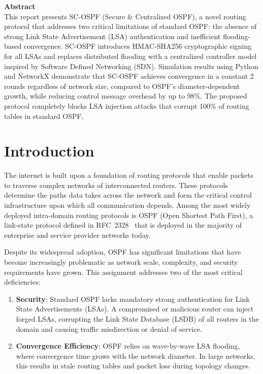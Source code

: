 \documentclass[12pt,a4paper]{article}
\begin{document}
\begin{titlepage}
\begin{mdframed}[backgroundcolor=lightgreen,linecolor=accentteal]
\textbf{\color{accentteal}Abstract}\\[4pt]
This report presents SC-OSPF (Secure \& Centralized OSPF), a novel routing
protocol that addresses two critical limitations of standard OSPF: the absence
of strong Link State Advertisement (LSA) authentication and inefficient
flooding-based convergence. SC-OSPF introduces HMAC-SHA256 cryptographic
signing for all LSAs and replaces distributed flooding with a centralized
controller model inspired by Software Defined Networking (SDN). Simulation
results using Python and NetworkX demonstrate that SC-OSPF achieves convergence
in a constant 2 rounds regardless of network size, compared to OSPF's
diameter-dependent growth, while reducing control message overhead by up to 98\%.
The proposed protocol completely blocks LSA injection attacks that corrupt 100\%
of routing tables in standard OSPF.
\end{mdframed}
\end{titlepage}

\tableofcontents\newpage

\section{Introduction}

The internet is built upon a foundation of routing protocols that enable packets
to traverse complex networks of interconnected routers. These protocols determine
the paths data takes across the network and form the critical control
infrastructure upon which all communication depends. Among the most widely
deployed intra-domain routing protocols is OSPF (Open Shortest Path First), a
link-state protocol defined in RFC~2328~\cite{rfc2328} that is deployed in the
majority of enterprise and service provider networks today.

Despite its widespread adoption, OSPF has significant limitations that have
become increasingly problematic as network scale, complexity, and security
requirements have grown. This assignment addresses two of the most critical
deficiencies:

\begin{enumerate}[itemsep=4pt]
  \item \textbf{Security}: Standard OSPF lacks mandatory strong authentication
  for Link State Advertisements (LSAs). A compromised or malicious router can
  inject forged LSAs, corrupting the Link State Database (LSDB) of all routers
  in the domain and causing traffic misdirection or denial of service.

  \item \textbf{Convergence Efficiency}: OSPF relies on wave-by-wave LSA
  flooding, where convergence time grows with the network diameter. In large
  networks, this results in stale routing tables and packet loss during
  topology changes.
\end{enumerate}
\end{document}
